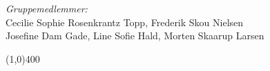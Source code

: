 \vspace*{\fill}
\begin{center}
	\textit{Gruppemedlemmer:}\\
	Cecilie Sophie Rosenkrantz Topp, Frederik Skou Nielsen \\
	Josefine Dam Gade, Line Sofie Hald, Morten Skaarup Larsen
\end{center}
\begin{center}
	\line(1,0){400}
\end{center}